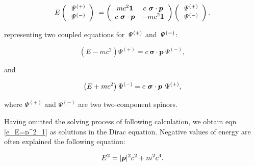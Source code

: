\documentclass[%
 reprint,
 amsmath,amssymb,
 aps,
]{revtex4-1}
\numberwithin{equation}{section}%
\begin{document}
        \begin{align}
            E
            \left( 
                \begin{array}{c}
                    \it\Psi^{(+)} \\ \it\Psi^{(-)}
                \end{array}
            \right) \
            =
            \left(
                \begin{array}{cc}
                    m c^2 \bm{1} 
                        & c \ \bm{\sigma} \cdot \bm{p} \\
                    c \ \bm{\sigma} \cdot \bm{p}
                        & - m c^2 \bm{1} \end{array}
            \right)
            \left(
                \begin{array}{c}
                    \it\Psi^{(+)} \\ \it\Psi^{(-)}
                \end{array}
            \right)
            \label{e_matrix_1}
            .
        \end{align}

    representing two coupled equations for $\it \Psi^{(+)}$ and $\it \Psi^{(-)}$:
    
    \begin{equation}
        \left( E - m c^{2} \right) \Psi^{(+)}
        = c \ \bm{\sigma} \cdot \bm{p} \ \Psi^{(-)}
        ,
    \end{equation}
    
    \noindent
    and

    \begin{equation}
        \left( E + m c^{2} \right) \Psi^{(-)}
        = c \ \bm{\sigma} \cdot \bm{p} \ \Psi^{(+)} \\
        ,
    \end{equation}

    \noindent
    where $\Psi^{(+)}$ and $\Psi^{(-)}$ are two two-component spinors.
    
    Having omitted the solving process of following calculation, we obtain eqn \ref{e_E=p^2_1} as solutions in the Dirac equation. Negative values of energy are often explained the following equation:


        \begin{equation}
            E^{2} = |\bm{p}|^{2} c^{2} + m^{2} c^{4}
            \label{e_E=p^2_1}
            \\.
        \end{equation}
\end{document}
